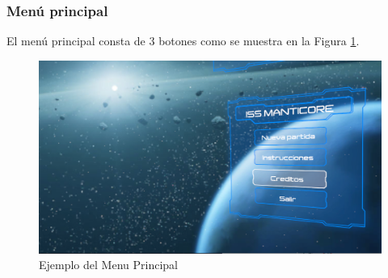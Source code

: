 \subsubsection{Menú principal}
El menú principal consta de 3 botones como se muestra en la Figura \ref{fig:MenuPrincipal3D1}.
\begin{figure}[H]
	\centering
	\includegraphics[scale=0.35]{imagenes/MenuPrincipal3D1.png}
	\caption{\label{fig:MenuPrincipal3D1}Ejemplo del Menu Principal}
\end{figure}


